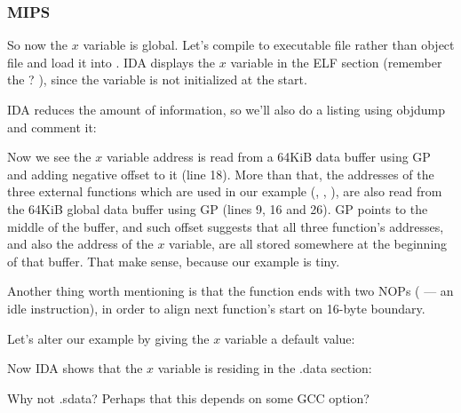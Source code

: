 \subsubsection{MIPS}


So now the $x$ variable is global.
Let's compile to executable file rather than object file and load it into \IDA.
IDA displays the $x$ variable in the  ELF section (remember the ? ),
since the variable is not initialized at the start.



IDA reduces the amount of information, so we'll also do a listing using objdump and comment it:



Now we see the $x$ variable address is read from a 64KiB data buffer using GP and adding negative offset to it (line 18).
More than that, the addresses of the three external functions  which are used in our example (\puts, \scanf, \printf), are also read from the 64KiB global data buffer using GP (lines 9, 16 and 26).
GP points to the middle of the buffer, and such offset suggests that all three function's addresses,
and also the address of the $x$ variable, are all stored somewhere at the beginning of that buffer.
That make sense, because our example is tiny.


Another thing worth mentioning is that the function ends with two \ac{NOP}s ( --- an idle instruction), in order to align next function's start on 16-byte boundary.


Let's alter our example by giving the $x$ variable a default value:



Now IDA shows that the $x$ variable is residing in the .data section:



Why not .sdata? Perhaps that this depends on some GCC option?

